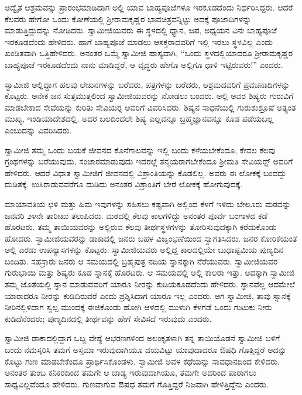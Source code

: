  ಅದ್ವೈತ ಆಶ್ರಮವನ್ನು ಪ್ರಾರಂಭಮಾಡಿದಾಗ ಅಲ್ಲಿ ಯಾವ ಬಾಹ್ಯಪೂಜೆಗಳೂ ಇರಕೂಡದೆಂದು ನಿರ್ಧರಿಸಿದ್ದರು. ಆದರೆ ಕೆಲವರು ಹೇಗೋ ಒಂದು ಕೋಣೆಯಲ್ಲಿ ಶ‍್ರೀರಾಮಕೃಷ್ಣರ ಭಾವಚಿತ್ರವನ್ನಿಟ್ಟು ಅದಕ್ಕೆ ಪೂಜಾದಿಗಳನ್ನು ಮಾಡುತ್ತಿದ್ದುದನ್ನು ನೋಡಿದರು. ಸ್ವಾಮೀಜಿಯವರು ಈ ಸ್ಥಳದಲ್ಲಿ ಧ್ಯಾನ, ಜಪ, ಅಧ್ಯಯನ ವಿನಃ ಬಾಹ್ಯಪೂಜೆ ಇರಕೂಡದೆಂದು ಹೇಳಿದರು. ಹಾಗೆ ಬಾಹ್ಯಪೂಜೆ ಮಾಡಲು ಆಸಕ್ತರಾದವರಿಗೆ ಇಲ್ಲಿ ಇರಲು ಸ್ಥಳವಿಲ್ಲ ಎಂದು ಖಂಡಿತವಾಗಿ ಒತ್ತಿಹೇಳಿದರು. ಅನಂತರ ಒಮ್ಮೆ ಸ್ವಾಮೀಜಿ ಹಾಸ್ಯವಾಗಿ, “ಒಂದು ಸ್ಥಳದಲ್ಲಿಯಾದರೂ ಶ‍್ರೀರಾಮಕೃಷ್ಣರ ಬಾಹ್ಯಪೂಜೆ ಇರಕೂಡದೆಂದು ನಾನು ಮಾಡಿದ್ದರೆ, ಆ ವೃದ್ಧರು ಹೇಗೊ ಅಲ್ಲಿಗೂ ಧಾಳಿ ಇಟ್ಟಿರುವರು!” ಎಂದರು. 

 ಸ್ವಾಮೀಜಿ ಅಲ್ಲಿದ್ದಾಗ ಹಲವು ಲೇಖನಗಳನ್ನು ಬರೆದರು, ಪತ್ರಗಳನ್ನು ಬರೆದರು, ಆಶ್ರಮದವರಿಗೆ ಪ್ರವಚನಾದಿಗಳನ್ನು ಕೊಟ್ಟರು. ಅನೇಕ ಜನ ಸುತ್ತಮುತ್ತಲಿಂದ ಸ್ವಾಮೀಜಿಯವರನ್ನು ನೋಡಲು ಬಂದರು. ಅಲ್ಲಿ ಅವರ ಶಿಷ್ಯರು ಗುರುವಿಗೆ ಮಾಡಬೇಕಾದ ಸೇವೆಯನ್ನು ಕುರಿತು ಸೇವಿಯರ‍್ಸ ಅವರಿಗೆ ವಿವರಿಸಿದರು. ಶಿಷ್ಯನ ಸಾಧನೆಯಲ್ಲಿ ಗುರುಶುಶ್ರೂಷೆ ಅತ್ಯಂತ ಮುಖ್ಯ, ಇಂಡಿಯಾದೇಶದಲ್ಲಿ. ಅದರ ಬಲದಿಂದಲೇ ಶಿಷ್ಯ ಎಲ್ಲವನ್ನೂ ಬ್ರಹ್ಮಜ್ಞಾನವನ್ನೂ ಕೂಡ ಪಡೆಯಬಲ್ಲ ಎಂಬುದನ್ನು ವಿವರಿಸಿದರು. 

 ಸ್ವಾಮೀಜಿ ತಮ್ಮ ಒಂದು ಬಯಕೆ ಜೀವನದ ಕೊನೆಗಾಲವನ್ನು ಇಲ್ಲಿ ಬಂದು ಕಳೆಯಬೇಕೆಂದೂ, ಕೇವಲ ಕೆಲವು ಗ್ರಂಥಗಳನ್ನು ಬರೆಯುವುದು, ಸಂಚಾರಮಾಡುವುದು ಇದರಲ್ಲೆ ತನ್ಮಯರಾಗಬೇಕೆಂದೂ ಶ‍್ರೀಮತಿ ಸೇವಿಯರ್ಸ್‍‍ ಅವರಿಗೆ ಹೇಳಿದರು. ಆದರೆ ವಿಧಾತ ಸ್ವಾಮೀಜಿಗೆ ಜೀವನದಲ್ಲಿ ವಿಶ್ರಾಂತಿಯನ್ನು ಕೊಡಲಿಲ್ಲ. ಅವರು ಈ ಲೋಕಕ್ಕೆ ಬಂದದ್ದು ದುಡಿತಕ್ಕೆ. ಉಸಿರಾಡುವವರೆಗೂ ದುಡಿದು ಅನಂತರ ವಿಶ್ರಾಂತಿಗೆ ಬೇರೆ ಲೋಕಕ್ಕೆ ಹೋಗುವುದಕ್ಕೆ. 

 ಮಾಯಾವತಿಯ ಛಳಿ ಮತ್ತು ಹಿಮ ಇವುಗಳನ್ನು ಸಹಿಸಲು ಕಷ್ಟವಾಗಿ ಅಲ್ಲಿಂದ ಕೆಳಗೆ ಇಳಿದು ಬೇಲೂರು ಮಠವನ್ನು ಜನವರಿ ೨೪ನೇ ತಾರೀಖು ತಲುಪಿದರು. ಮಠದಲ್ಲಿ ಕೆಲವು ಕಾಲಗಳಿದ್ದು ಅನಂತರ ಪೂರ್ವ ಬಂಗಾಳದ ಕಡೆ ಹೊರಟರು. ತಮ್ಮ ತಾಯಿಯವರನ್ನು ಅಲ್ಲಿರುವ ಕೆಲವು ತೀರ್ಥಸ್ಥಳಗಳನ್ನು ತೋರಿಸುವುದಕ್ಕಾಗಿ ಕರೆದುಕೊಂಡು ಹೋದರು. ಸ್ವಾಮೀಜಿಯವರನ್ನು ಡಾಕಾದಲ್ಲಿ ಜನರು ಬಹಳ ವಿಜೃಂಭಣೆಯಿಂದ ಸ್ವಾಗತಿಸಿದರು. ಜನರ ಕೋರಿಕೆಯಂತೆ ಅಲ್ಲಿ ಎರಡು ಉಪನ್ಯಾಸಗಳನ್ನು ಕೊಟ್ಟರು. ಸ್ವಾಮೀಜಿಯವರು ಅಲ್ಲಿದ್ದ ಕಾಲದಲ್ಲಿಯೇ ಬುಧಾಷ್ಟಮಿಯ ಪುಣ್ಯದಿನ ಬಂದಿತು. ಸಹಸ್ರಾರು ಜನರು ಆ ಸಮಯದಲ್ಲಿ ಬ್ರಹ್ಮಪುತ್ರ ನದಿಯ ಸ್ನಾನಕ್ಕಾಗಿ ನೆರೆಯುವರು. ಸ್ವಾಮೀಜಿಯವರ ಗುರುಭಾಯಿ ಮತ್ತು ಶಿಷ್ಯರು ಕೂಡ ಸ್ನಾನಕ್ಕೆ ಹೊರಟರು. ಆ ಸಮಯದಲ್ಲಿ ಅಲ್ಲಿ ಕಾಲರಾ ಇತ್ತು. ಅದಕ್ಕಾಗಿ ಸ್ವಾಮೀಜಿ ತಮ್ಮ ಜೊತೆಯಲ್ಲಿ ಸ್ನಾನ ಮಾಡುವವರಿಗೆ ಯಾರೂ ನೀರನ್ನು ಕುಡಿಯಕೂಡದೆಂದು ಹೇಳಿದರು. ಸ್ನಾನವೆಲ್ಲ ಆದಮೇಲೆ ಯಾರಾದರೂ ನೀರನ್ನು ಕುಡಿದಿರುವರೆ ಎಂದು ಪ್ರಶ್ನಿಸಿದಾಗ ಯಾರೂ ಇಲ್ಲ ಎಂದರು. ಆಗ ಸ್ವಾಮೀಜಿ, ತಾವು ಸ್ನಾನಕ್ಕೆ ನೀರಿನಲ್ಲಿಳಿದಾಗ ಸ್ವಲ್ಪ ಮುಂದಕ್ಕೆ ಈಜಿಕೊಂಡು ಹೋಗಿ ಆಳದಲ್ಲಿ ಮುಳುಗಿ ಕೆಳಗಡೆ ಒಂದು ಗುಟುಕು ನೀರು ಕುಡಿದೆನೆಂದರು; ಪುಣ್ಯದಿನದಲ್ಲಿ ತೀರ್ಥವನ್ನು ಹೇಗೆ ಸೇವಿಸದೆ ಇರುವುದು ಎಂದರು. 

 ಸ್ವಾಮೀಜಿ ಡಾಕಾದಲ್ಲಿದ್ದಾಗ ಒಬ್ಬ ವೇಶ್ಯೆ ಆಭರಣಗಳಿಂದ ಅಲಂಕೃತಳಾಗಿ ತನ್ನ ತಾಯಿಯೊಡನೆ ಸ್ವಾಮೀಜಿ ಬಳಿಗೆ ಬಂದು ನಮಸ್ಕರಿಸಿ ತಮಗೆ ಅಸ್ತಮಾ ಇರುವುದಾಗಿಯೂ ದಯವಿಟ್ಟು ಯಾವುದಾದರೂ ಔಷಧಿ ಗೊತ್ತಿದ್ದರೆ ಅದನ್ನು ಕೊಟ್ಟು ಗುಣ ಮಾಡಬೇಕೆಂದೂ‌ ಪ್ರಾರ್ಥಿಸಿಕೊಂಡಳು. ಸ್ವಾಮೀಜಿ ಅವಳ ಕಥೆಯನ್ನು ಸಾವಧಾನದಿಂದ ಕೇಳಿದರು. ಅನಂತರ ತುಂಬ ಕನಿಕರದಿಂದ ತಮಗೇ ಆ ಜಾಡ್ಯ ಇರುವುದಾಗಿಯೂ, ತಮಗೇ ಅದರಿಂದ ಪಾರಾಗಲು ಸಾಧ್ಯವಿಲ್ಲವೆಂದೂ ಹೇಳಿದರು. ಗುಣವಾಗುವ ಔಷಧ ತಮಗೆ ಗೊತ್ತಿದ್ದರೆ ನಿಜವಾಗಿ ಹೇಳಿತ್ತಿದ್ದೆನು ಎಂದರು. 

